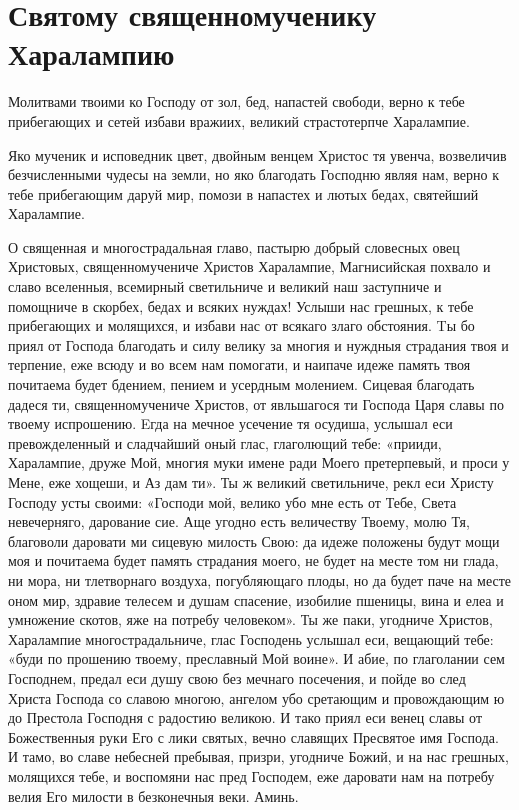 \section{Святому священномученику Харалампию}
 




Молитвами твоими ко Господу от зол, бед, напастей свободи, верно к тебе прибегающих и сетей избави вражиих, великий страстотерпче Харалампие.




Яко мученик и исповедник цвет, двойным венцем Христос тя увенча, возвеличив безчисленными чудесы на земли, но яко благодать Господню являя нам, верно к тебе прибегающим даруй мир, помози в напастех и лютых бедах, святейший Харалампие.




О священная и многострадальная главо, пастырю добрый словесных овец Христовых, священномучениче Христов Харалампие, Магнисийская похвало и славо вселенныя, всемирный светильниче и великий наш заступниче и помощниче в скорбех, бедах и всяких нуждах! Услыши нас грешных, к тебе прибегающих и молящихся, и избави нас от всякаго злаго обстояния.  Tы бо приял от Господа благодать и силу велику за многия и нуждныя страдания твоя и терпение, еже всюду и во всем нам помогати, и наипаче идеже память твоя почитаема будет бдением, пением и усердным молением. Сицевая благодать дадеся ти, священномучениче Христов, от явльшагося ти Господа Царя славы по твоему испрошению. Eгда на мечное усечение тя осудиша, услышал еси превожделенный и сладчайший оный глас, глаголющий тебе: «прииди, Харалампие, друже Мой, многия муки имене ради Моего претерпевый, и проси у Мене, еже хощеши, и Аз дам ти». Ты ж великий светильниче, рекл еси Христу Господу усты своими:  «Господи мой, велико убо мне есть от Тебе, Света невечерняго, дарование сие. Аще угодно есть величеству Твоему, молю Тя, благоволи даровати ми сицевую милость Свою: да идеже положены будут мощи моя и почитаема будет память страдания моего, не будет на месте том ни глада, ни мора, ни тлетворнаго воздуха, погубляющаго плоды, но да будет паче на месте оном мир, здравие телесем и душам спасение, изобилие пшеницы, вина и елеа и умножение скотов, яже на потребу человеком». Ты же паки, угодниче Христов, Харалампие многострадальниче, глас Господень услышал еси, вещающий тебе: «буди по прошению твоему, преславный Мой воине». И абие, по глаголании сем Господнем, предал еси душу свою без мечнаго посечения, и пойде во след Христа Господа со славою многою, ангелом убо сретающим и провождающим ю до Престола Господня с радостию великою. И тако приял еси венец славы от Божественныя руки Его с лики святых, вечно славящих Пресвятое имя Господа. И тамо, во славе небесней пребывая, призри, угодниче Божий, и на нас грешных, молящихся тебе, и воспомяни нас пред Господем, еже даровати нам на потребу велия Его милости в безконечныя веки. Аминь.
\mychapterending

